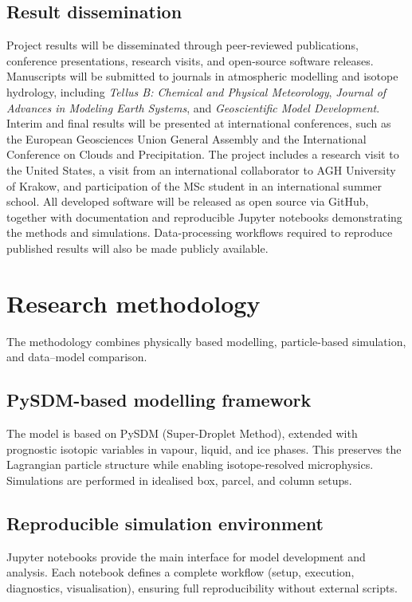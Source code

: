 \documentclass[11pt]{article}
\begin{document}
\subsection*{Result dissemination}
Project results will be disseminated through peer-reviewed publications, conference presentations, research visits, and open-source software releases. Manuscripts will be submitted to journals in atmospheric modelling and isotope hydrology, including \emph{Tellus B: Chemical and Physical Meteorology}, \emph{Journal of Advances in Modeling Earth Systems}, and \emph{Geoscientific Model Development}.
Interim and final results will be presented at international conferences, such as the European Geosciences Union General Assembly and the International Conference on Clouds and Precipitation.
The project includes a research visit to the United States, a visit from an international collaborator to AGH University of Krakow, and participation of the MSc student in an international summer school.
All developed software will be released as open source via GitHub, together with documentation and reproducible Jupyter notebooks demonstrating the methods and simulations. Data-processing workflows required to reproduce published results will also be made publicly available.


\section{Research methodology}
The methodology combines physically based modelling, particle-based simulation, and data–model comparison.

\subsection*{PySDM-based modelling framework}
The model is based on PySDM (Super-Droplet Method), extended with prognostic isotopic variables in vapour, liquid, and ice phases. This preserves the Lagrangian particle structure while enabling isotope-resolved microphysics. Simulations are performed in idealised box, parcel, and column setups.

\subsection*{Reproducible simulation environment}
Jupyter notebooks provide the main interface for model development and analysis. Each notebook defines a complete workflow (setup, execution, diagnostics, visualisation), ensuring full reproducibility without external scripts.
\end{document}
